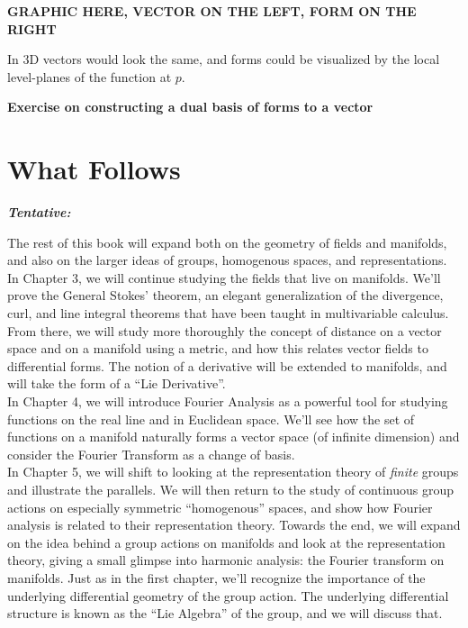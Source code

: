 	\textbf{GRAPHIC HERE, VECTOR ON THE LEFT, FORM ON THE RIGHT}
	
	In $3$D vectors would look the same, and forms could be visualized by the local level-planes of the function at $p$.
	
	\textbf{Exercise on constructing a dual basis of forms to a vector}
	
	\section{What Follows} %
	\label{sec:what_follows}
	
	\begin{center}
		\textbf{\emph{{Tentative:}}}\\
	\end{center}
	The rest of this book will expand both on the geometry of fields and manifolds, and also on the larger ideas of groups, homogenous spaces, and representations. \\
	
	In Chapter 3, we will continue studying the fields that live on manifolds. We'll prove the General Stokes' theorem, an elegant generalization of the divergence, curl, and line integral theorems that have been taught in multivariable calculus. From there, we will study more thoroughly the concept of distance on a vector space and on a manifold using a metric, and how this relates vector fields to differential forms. The notion of a derivative will be extended to manifolds, and will take the form of a ``Lie Derivative''.\\
	
	In Chapter 4, we will introduce Fourier Analysis as a powerful tool for studying functions on the real line and in Euclidean space. We'll see how the set of functions on a manifold naturally forms a vector space (of infinite dimension) and consider the Fourier Transform as a change of basis. \\
	
	In Chapter 5, we will shift to looking at the representation theory of \emph{finite} groups and illustrate the parallels. We will then return to the study of continuous group actions on especially symmetric ``homogenous'' spaces, and show how Fourier analysis is related to their representation theory. Towards the end, we will expand on the idea behind a group actions on manifolds and look at the representation theory, giving a small glimpse into harmonic analysis: the Fourier transform on manifolds. Just as in the first chapter, we'll recognize the importance of the underlying differential geometry of the group action. The underlying differential structure is known as the ``Lie Algebra'' of the group, and we will discuss that.\\
	
